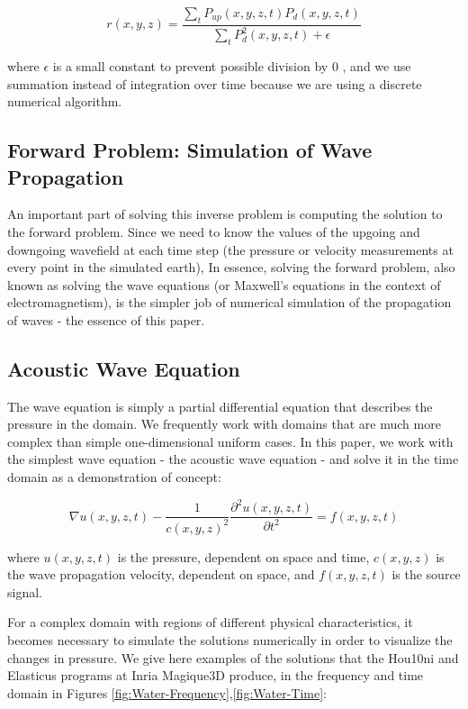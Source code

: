 $$r(x,y,z) = \frac{\sum\limits_t P_{up}(x,y,z,t) P_d(x,y,z,t)}{\sum\limits_t P_d^2(x,y,z,t) + \epsilon}$$ 

where $\epsilon$ is a small constant to prevent possible division by $0$ \cite{EAGE}, and we use summation instead of integration over time because we are using a discrete numerical algorithm.



\subsection{Forward Problem: Simulation of Wave Propagation}

An important part of solving this inverse problem is computing the solution to the forward problem. Since we need to know the values of the upgoing and downgoing wavefield at each time step (the pressure or velocity measurements at every point in the simulated earth), In essence, solving the forward problem, also known as solving the wave equations (or Maxwell's equations in the context of electromagnetism), is the simpler job of numerical simulation of the propagation of waves - the essence of this paper. 


\subsection{Acoustic Wave Equation}

The wave equation is simply a partial differential equation that describes the pressure in the domain. We frequently work with domains that are much more complex than simple one-dimensional uniform cases. In this paper, we work with the simplest wave equation - the acoustic wave equation - and solve it in the time domain as a demonstration of concept:

$$\nabla u(x,y,z,t) - \frac{1}{c(x,y,z)^2} \frac{\partial^2 u(x,y,z,t)}{\partial t^2} = f(x,y,z,t)$$

where $u(x,y,z,t)$ is the pressure, dependent on space and time, $c(x,y,z)$ is the wave propagation velocity, dependent on space, and $f(x,y,z,t)$ is the source signal.


For a complex domain with regions of different physical characteristics, it becomes necessary to simulate the solutions numerically in order to visualize the changes in pressure. We give here examples of the solutions that the Hou10ni and Elasticus programs at Inria Magique3D produce, in the frequency and time domain in Figures \ref{fig:Water-Frequency},\ref{fig:Water-Time}: 

